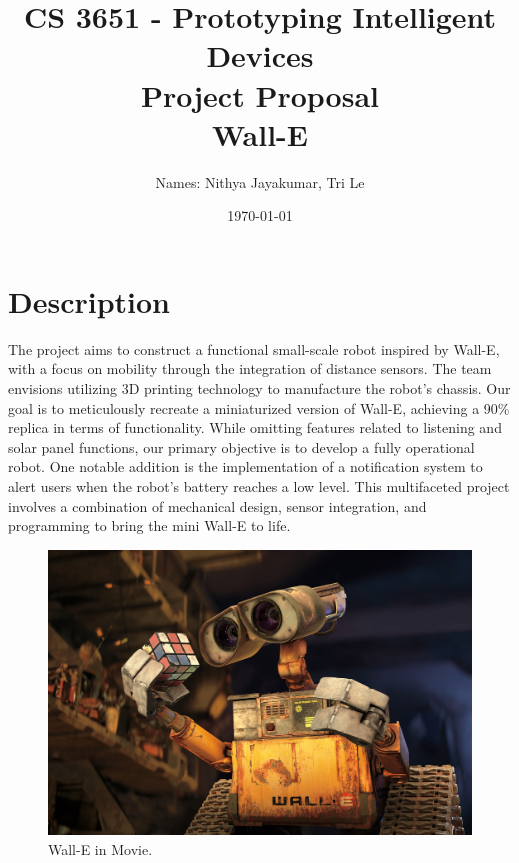 \documentclass[12pt]{article}
\title{CS 3651 - Prototyping Intelligent Devices\\ Project Proposal \\Wall-E}
\author{Names: Nithya Jayakumar, Tri Le}
\date{\today}
\begin{document}
\maketitle

\newpage
\section{Description} %
    The project aims to construct a functional small-scale robot inspired by Wall-E, with a focus on mobility through the integration of distance sensors. The team envisions utilizing 3D printing technology to manufacture the robot's chassis. Our goal is to meticulously recreate a miniaturized version of Wall-E, achieving a 90\% replica in terms of functionality. While omitting features related to listening and solar panel functions, our primary objective is to develop a fully operational robot. One notable addition is the implementation of a notification system to alert users when the robot's battery reaches a low level. This multifaceted project involves a combination of mechanical design, sensor integration, and programming to bring the mini Wall-E to life.

    \begin{figure}[H]
        \centering
        \includegraphics[width=0.6\linewidth]{wall-eee.jpg}
        \caption{Wall-E in Movie.}
    \end{figure}
\end{document}
